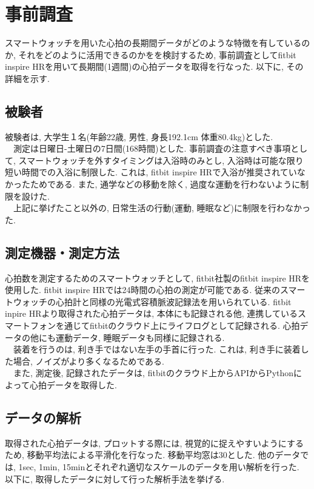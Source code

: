 \documentclass[report, 11pt, a4paper]{jsbook}
\begin{document}
\chapter{事前調査}
スマートウォッチを用いた心拍の長期間データがどのような特徴を有しているのか, それをどのように活用できるのかをを検討するため, 事前調査としてfitbit inspire HRを用いて長期間(1週間)の心拍データを取得を行なった. 以下に, その詳細を示す.

\section{被験者}
被験者は, 大学生１名(年齢22歳, 男性, 身長192.1cm 体重80.4kg)とした.\\
　測定は日曜日-土曜日の7日間(168時間)とした. 事前調査の注意すべき事項として, スマートウォッチを外すタイミングは入浴時のみとし, 入浴時は可能な限り短い時間での入浴に制限した. これは, fitbit inspire HRで入浴が推奨されていなかったためである. また, 通学などの移動を除く, 過度な運動を行わないように制限を設けた. \\
　上記に挙げたこと以外の, 日常生活の行動(運動, 睡眠など)に制限を行わなかった. 

\section{測定機器・測定方法}
心拍数を測定するためのスマートウォッチとして, fitbit社製のfitbit inspire HRを使用した. fitbit inspire HRでは24時間の心拍の測定が可能である. 従来のスマートウォッチの心拍計と同様の光電式容積脈波記録法を用いられている. fitbit inpire HRより取得された心拍データは, 本体にも記録される他, 連携しているスマートフォンを通じてfitbitのクラウド上にライフログとして記録される. 心拍データの他にも運動データ, 睡眠データも同様に記録される.\\
　装着を行うのは, 利き手ではない左手の手首に行った. これは, 利き手に装着した場合, ノイズがより多くなるためである. \\
　また, 測定後, 記録されたデータは, fitbitのクラウド上からAPIからPythonによって心拍データを取得した. 

\section{データの解析}
取得された心拍データは, プロットする際には, 視覚的に捉えやすいようにするため, 移動平均法による平滑化を行なった. 移動平均窓は30とした. 他のデータでは, 1sec, 1min, 15minとそれぞれ適切なスケールのデータを用い解析を行った. 以下に, 取得したデータに対して行った解析手法を挙げる. 
\end{document}
